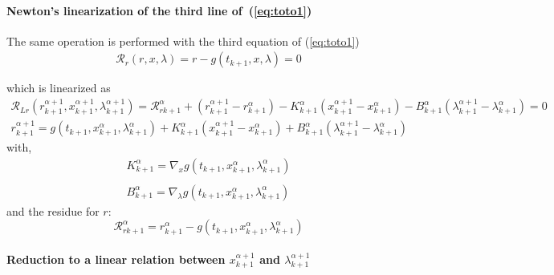  \paragraph{Newton's linearization of the third  line of~(\ref{eq:toto1})}
The same operation is performed with the third equation of (\ref{eq:toto1})
\begin{equation}
  \begin{array}{l}
    \mathcal R_r(r,x,\lambda)=r-g(t_{k+1},x,\lambda) =0\\ \\  \end{array}
\end{equation}
which is linearized as
\begin{equation}
  \label{eq:NL9}
  \begin{array}{l}
      \mathcal R_{Lr}(r^{\alpha+1}_{k+1},x^{\alpha+1}_{k+1},\lambda^{\alpha+1}_{k+1}) = \mathcal
      R_{rk+1}^{\alpha} + (r^{\alpha+1}_{k+1} - r^{\alpha}_{k+1}) -
      K^{\alpha}_{k+1}(x^{\alpha+1}_{k+1} - x^{\alpha}_{k+1})- B^{\alpha}_{k+1}(\lambda^{\alpha+1}_{k+1} -
      \lambda^{\alpha}_{k+1})=0
    \end{array}
  \end{equation}
\begin{equation}
  \label{eq:rrL}
  \begin{array}{l}
    \boxed{r^{\alpha+1}_{k+1} = g(t_{k+1},x ^{\alpha}_{k+1},\lambda ^{\alpha}_{k+1}) +
      K^{\alpha}_{k+1}(x^{\alpha+1}_{k+1} - x^{\alpha}_{k+1})
      + B^{\alpha}_{k+1}(\lambda^{\alpha+1}_{k+1} - \lambda^{\alpha}_{k+1})
    }       
  \end{array}
\end{equation}
with,
\begin{equation}
     \begin{array}{l}
  K^{\alpha}_{k+1} = \nabla_xg(t_{k+1},x^{\alpha}_{k+1},\lambda ^{\alpha}_{k+1})  \\ \\
  B^{\alpha}_{k+1} = \nabla_{\lambda}g(t_{k+1},x^{\alpha}_{k+1},\lambda ^{\alpha}_{k+1})
 \end{array}
\end{equation}
and the  residue for $r$:
\begin{equation}
\boxed{\mathcal
      R_{rk+1}^{\alpha} = r^{\alpha}_{k+1} - g(t_{k+1},x^{\alpha}_{k+1},\lambda ^{\alpha}_{k+1})}
  \end{equation}


\paragraph{Reduction to a linear relation between  $x^{\alpha+1}_{k+1}$ and
$\lambda^{\alpha+1}_{k+1}$}


